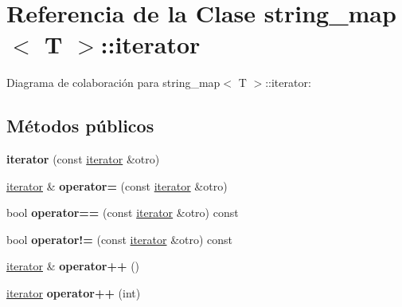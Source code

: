 \hypertarget{classstring__map_1_1iterator}{\section{Referencia de la Clase string\+\_\+map$<$ T $>$\+:\+:iterator}
\label{classstring__map_1_1iterator}
}


Diagrama de colaboración para string\+\_\+map$<$ T $>$\+:\+:iterator\+:
\subsection*{Métodos públicos}
\begin{DoxyCompactItemize}
\item 
\hypertarget{classstring__map_1_1iterator_a9df25d3db3ed0add76349c1187c4a8d3}{{\bfseries iterator} (const \hyperlink{classstring__map_1_1iterator}{iterator} \&otro)}\label{classstring__map_1_1iterator_a9df25d3db3ed0add76349c1187c4a8d3}

\item 
\hypertarget{classstring__map_1_1iterator_a79724b309f9b7c34e9617dda8bc029ce}{\hyperlink{classstring__map_1_1iterator}{iterator} \& {\bfseries operator=} (const \hyperlink{classstring__map_1_1iterator}{iterator} \&otro)}\label{classstring__map_1_1iterator_a79724b309f9b7c34e9617dda8bc029ce}

\item 
\hypertarget{classstring__map_1_1iterator_a08388fedd9552335c7a422c2dc459303}{bool {\bfseries operator==} (const \hyperlink{classstring__map_1_1iterator}{iterator} \&otro) const }\label{classstring__map_1_1iterator_a08388fedd9552335c7a422c2dc459303}

\item 
\hypertarget{classstring__map_1_1iterator_ae84b749f2b7fd1ad4377b76f44a8cbb4}{bool {\bfseries operator!=} (const \hyperlink{classstring__map_1_1iterator}{iterator} \&otro) const }\label{classstring__map_1_1iterator_ae84b749f2b7fd1ad4377b76f44a8cbb4}

\item 
\hypertarget{classstring__map_1_1iterator_a778cc925cf490cea0d6093a7d477413f}{\hyperlink{classstring__map_1_1iterator}{iterator} \& {\bfseries operator++} ()}\label{classstring__map_1_1iterator_a778cc925cf490cea0d6093a7d477413f}

\item 
\hypertarget{classstring__map_1_1iterator_a010a924df4202bda4b0c555e78cd0b1b}{\hyperlink{classstring__map_1_1iterator}{iterator} {\bfseries operator++} (int)}\label{classstring__map_1_1iterator_a010a924df4202bda4b0c555e78cd0b1b}


\end{DoxyCompactItemize}
